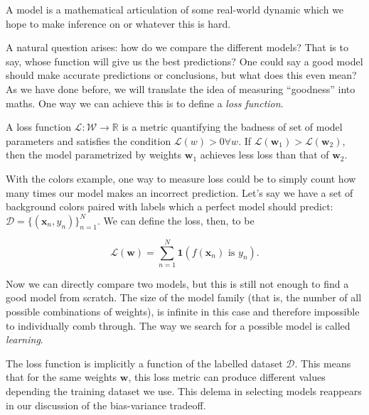 \begin{definition}[model]
    A model is a mathematical articulation of some real-world dynamic which we hope to make inference on or whatever this is hard. 
\end{definition}

A natural question arises: how do we compare the different models? That is to say, whose function will give us the best predictions? One could say a good model should make accurate predictions or conclusions, but what does this even mean? As we have done before, we will translate the idea of measuring ``goodness'' into maths. One way we can achieve this is to define a \emph{loss function}.
\begin{definition}
    A loss function $\mathcal L : \mathcal W \to \mathbb R$ is a metric quantifying the badness of set of model parameters and satisfies the condition $\mathcal L(w) > 0 \forall w$. If $\mathcal L(\bm w_1) > \mathcal L(\bm w_2)$, then the model parametrized by weights $\bm w_1$ achieves less loss than that of $\bm w_2$.
\end{definition}

With the colors example, one way to measure loss could be to simply count how many times our model makes an incorrect prediction. Let's say we have a set of background colors paired with labels which a perfect model should predict: $\mathcal D = \{ (\bm x_n, y_n) \}_{n=1}^{N}$. We can define the loss, then, to be

$$\mathcal L(\bm w) = \sum_{n = 1}^N \bm 1(f(\bm x_n) \text{ is } y_n).$$

Now we can directly compare two models, but this is still not enough to find a good model from scratch. The size of the model family (that is, the number of all possible combinations of weights), is infinite in this case and therefore impossible to individually comb through. The way we search for a possible model is called \emph{learning}.

\begin{warning}
    The loss function is implicitly a function of the labelled dataset $\mathcal D$. This means that for the same weights $\bm w$, this loss metric can produce different values depending the training dataset we use. This delema in selecting models reappears in our discussion of the bias-variance tradeoff.
\end{warning}



